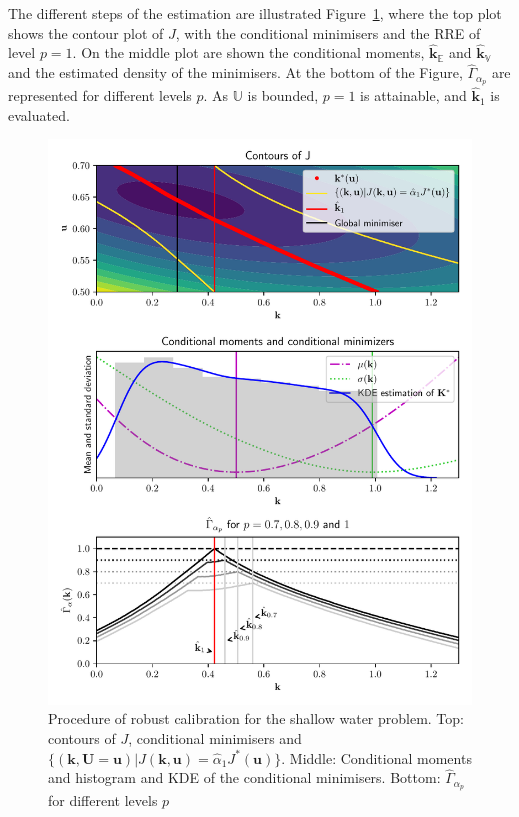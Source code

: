 \documentclass[preprint, 1p]{elsarticle}
\newcommand{\Ex}{\mathbb{E}}
\newcommand{\hatkmean}{\hat{\mathbf{k}}_{\Ex}}
\newcommand{\hatkvar}{\hat{\mathbf{k}}_{\mathbb{V}}}
\newcommand{\kest}{\hat{\mathbf{k}}}
\newcommand{\RRE}{RRE}
\newcommand{\Uspace}{\mathbb{U}}
\newlength{\singlecolumnsize}
\begin{document}
The different steps of the estimation are illustrated Figure~\ref{fig:estimation_swe}, where the top plot shows the contour plot of $J$, with the conditional minimisers and the \RRE{} of level $p=1$. On the middle plot are shown the conditional moments, $\hatkmean$ and $\hatkvar$ and the estimated density of the minimisers. At the bottom of the Figure, $\hat{\Gamma}_{\alpha_p}$ are represented for different levels $p$. As $\Uspace$ is bounded, $p=1$ is attainable, and $\kest_1$ is evaluated.

\begin{figure}[!h]
\centering
\includegraphics[width=\singlecolumnsize]{Figures/FIG10.pdf}
\caption{Procedure of robust calibration for the shallow water problem. Top: contours of $J$, conditional minimisers and $\{(\mathbf{k},\mathbf{U}=\mathbf{u}) | J(\mathbf{k},\mathbf{u}) = \hat{\alpha}_1 J^*(\mathbf{u})\}$. Middle: Conditional moments and histogram and KDE of the conditional minimisers. Bottom: $\hat{\Gamma}_{\alpha_p}$ for different levels $p$}
\label{fig:estimation_swe}
\end{figure}
\end{document}
